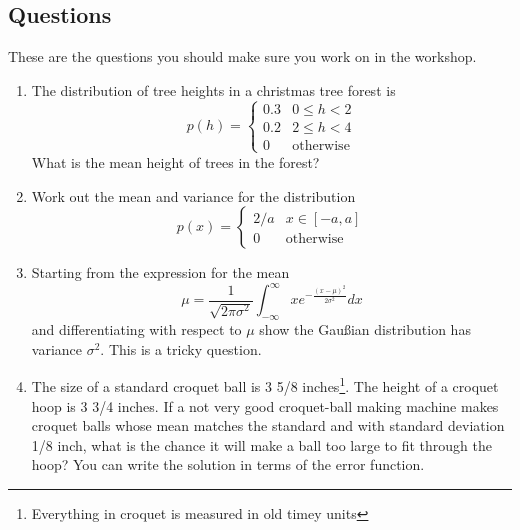 \documentclass[11pt,a4paper]{scrartcl}
\begin{document}
\subsection*{Questions}

These are the questions you should make sure you work on in the workshop.

\begin{enumerate}


\item The distribution of tree heights in a christmas tree forest is 
\begin{equation}
p(h)=\left\{\begin{array}{cc}0.3& 0\le h <2\\0.2& 2\le h<4\\0&\mbox{otherwise}\end{array}\right.
\end{equation}
What is the mean height of trees in the forest?

\item Work out the mean and variance for the distribution
  \begin{equation}
    p(x)=\left\{\begin{array}{ll}2/a&x\in [-a,a]\\0&\mbox{otherwise}\end{array}\right.
  \end{equation}

\item Starting from the expression for the mean
  \begin{equation}
    \mu=\frac{1}{\sqrt{2\pi\sigma^2}}\int_{-\infty}^\infty xe^{-\frac{(x-\mu)^2}{2\sigma^2}}dx
  \end{equation}
  and differentiating with respect to $\mu$ show the Gau\ss{}ian
  distribution has variance $\sigma^2$. This is a tricky question.

\item The size of a standard croquet ball is 3 5/8
  inches\footnote{Everything in croquet is measured in old timey
    units}. The height of a croquet hoop is 3 3/4 inches. If a not
  very good croquet-ball making machine makes croquet balls whose mean
  matches the standard and with standard deviation 1/8 inch, what is
  the chance it will make a ball too large to fit through the hoop?
  You can write the solution in terms of the error function.

  

\end{enumerate}
\end{document}
